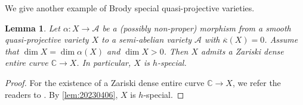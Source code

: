 \documentclass[11pt,english]{smfart}
\theoremstyle{plain}
\newtheorem{lem}[thm]{Lemma}
\theoremstyle{definition}
\theoremstyle{remark}
\newtheorem{rem}[thm]{Remark}
\numberwithin{equation}{subsection}
\theoremstyle{plain}
\def\rank{{\rm rank}\,}
\newcommand{\cA}{\mathcal A}
\newcommand{\bC}{\mathbb{C}}
\begin{document}
We give another example of Brody special quasi-projective varieties.
\begin{lem}\label{lem:ZD}
	Let $\alpha:X\to \cA$ be  a  (possibly non-proper)  morphism  from a smooth quasi-projective variety $X$ to a semi-abelian variety $\cA$ with   $\overline{\kappa}(X)=0$. 
	Assume that $\dim X=\dim \alpha(X)$ and $\dim X>0$.
	Then $X$ admits a Zariski dense entire curve $\mathbb C\to X$.
	In particular, $X$ is $h$-special. 
\end{lem}


\begin{proof} 
For the existence of a Zariski dense entire curve $\mathbb C\to X$, we refer the readers to \cite[Lemma 1.5]{CDY25}.
	By \cref{lem:20230406}, $X$ is $h$-special.
\end{proof}



 
 






 
 
 
 
 
 
 
 

 











 
\end{document}
